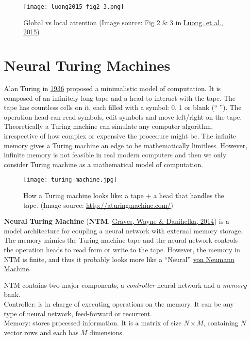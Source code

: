 \documentclass[12pt]{article}
\begin{document}
\begin{figure}[H]
    \centering
    \texttt{[image: luong2015-fig2-3.png]}
    \caption{Global vs local attention (Image source: Fig 2 \& 3 in \href{https://arxiv.org/pdf/1508.04025.pdf}{Luong, et al., 2015})}
\end{figure}

\section{Neural Turing Machines}
\label{neural-turing-machines}
Alan Turing in \href{https://en.wikipedia.org/wiki/Turing_machine}{1936} proposed a minimalistic model of computation. It is composed of an infinitely long tape and a head to interact with the tape. The tape has countless cells on it, each filled with a symbol: 0, 1 or blank (`` ''). The operation head can read symbols, edit symbols and move left/right on the tape. Theoretically a Turing machine can simulate any computer algorithm, irrespective of how complex or expensive the procedure might be. The infinite memory gives a Turing machine an edge to be mathematically limitless. However, infinite memory is not feasible in real modern computers and then we only consider Turing machine as a mathematical model of computation.

\begin{figure}[H]
    \centering
    \texttt{[image: turing-machine.jpg]}
    \caption{How a Turing machine looks like: a tape + a head that handles the tape. (Image source: \href{http://aturingmachine.com/}{http://aturingmachine.com/})}
\end{figure}

\textbf{Neural Turing Machine} (\textbf{NTM}, \href{https://arxiv.org/abs/1410.5401}{Graves, Wayne \& Danihelka, 2014}) is a model architecture for coupling a neural network with external memory storage. The memory mimics the Turing machine tape and the neural network controls the operation heads to read from or write to the tape. However, the memory in NTM is finite, and thus it probably looks more like a ``Neural'' \href{https://en.wikipedia.org/wiki/Von_Neumann_architecture}{von Neumann Machine}.

NTM contains two major components, a \emph{controller} neural network and a \emph{memory} bank.\\
Controller: is in charge of executing operations on the memory. It can be any type of neural network, feed-forward or recurrent.\\
Memory: stores processed information. It is a matrix of size $N \times M$, containing $N$ vector rows and each has $M$ dimensions.
\end{document}
